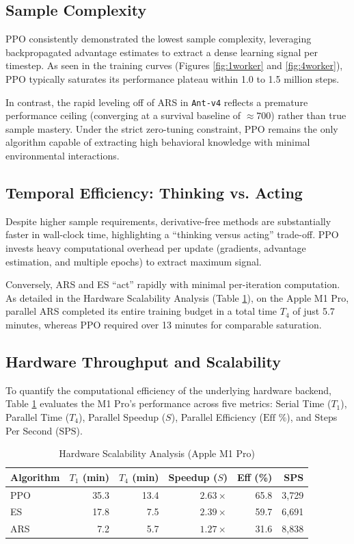 \subsection{Sample Complexity}
PPO consistently demonstrated the lowest sample complexity, leveraging backpropagated advantage estimates to extract a dense learning signal per timestep. As seen in the training curves (Figures \ref{fig:1worker} and \ref{fig:4worker}), PPO typically saturates its performance plateau within 1.0 to 1.5 million steps. 

In contrast, the rapid leveling off of ARS in \texttt{Ant-v4} reflects a premature performance ceiling (converging at a survival baseline of $\approx 700$) rather than true sample mastery. Under the strict zero-tuning constraint, PPO remains the only algorithm capable of extracting high behavioral knowledge with minimal environmental interactions.

\subsection{Temporal Efficiency: Thinking vs. Acting}
Despite higher sample requirements, derivative-free methods are substantially faster in wall-clock time, highlighting a ``thinking versus acting'' trade-off. PPO invests heavy computational overhead per update (gradients, advantage estimation, and multiple epochs) to extract maximum signal. 

Conversely, ARS and ES ``act'' rapidly with minimal per-iteration computation. As detailed in the Hardware Scalability Analysis (Table \ref{tab:hardware}), on the Apple M1 Pro, parallel ARS completed its entire training budget in a total time $T_4$ of just 5.7 minutes, whereas PPO required over 13 minutes for comparable saturation.

\subsection{Hardware Throughput and Scalability}
To quantify the computational efficiency of the underlying hardware backend, Table \ref{tab:hardware} evaluates the M1 Pro's performance across five metrics: Serial Time ($T_1$), Parallel Time ($T_4$), Parallel Speedup ($S$), Parallel Efficiency ($\text{Eff \%}$), and Steps Per Second ($\text{SPS}$).

\begin{table}[h!]
\centering
\caption{Hardware Scalability Analysis (Apple M1 Pro)}
\label{tab:hardware}
\begin{tabular}{@{}lrrrrr@{}}
\toprule
\textbf{Algorithm} & \textbf{$T_1$ (min)} & \textbf{$T_4$ (min)} & \textbf{Speedup ($S$)} & \textbf{Eff (\%)} & \textbf{SPS} \\ \midrule
PPO & 35.3 & 13.4 & $2.63\times$ & 65.8 & 3,729 \\
ES  & 17.8 & 7.5  & $2.39\times$ & 59.7 & 6,691 \\
ARS & 7.2  & 5.7  & $1.27\times$ & 31.6 & 8,838 \\ \bottomrule
\end{tabular}
\end{table}

